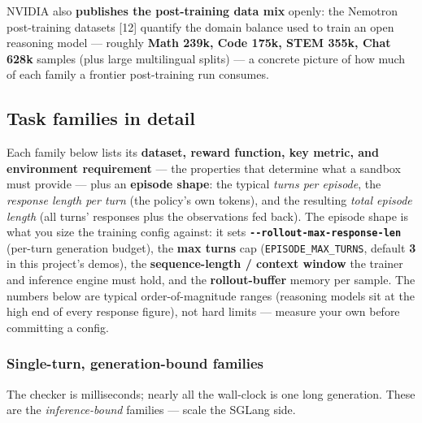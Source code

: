 \documentclass[
  paper=a4,
  ,captions=tableheading
]{scrartcl}
\begin{document}
NVIDIA also \textbf{publishes the post-training data mix} openly: the
Nemotron post-training datasets {[}12{]} quantify the domain balance
used to train an open reasoning model --- roughly \textbf{Math 239k,
Code 175k, STEM 355k, Chat 628k} samples (plus large multilingual
splits) --- a concrete picture of how much of each family a frontier
post-training run consumes.

\hypertarget{task-families-in-detail}{%
\subsection{Task families in detail}\label{task-families-in-detail}}

Each family below lists its \textbf{dataset, reward function, key
metric, and environment requirement} --- the properties that determine
what a sandbox must provide --- plus an \textbf{episode shape}: the
typical \emph{turns per episode}, the \emph{response length per turn}
(the policy's own tokens), and the resulting \emph{total episode length}
(all turns' responses plus the observations fed back). The episode shape
is what you size the training config against: it sets
\textbf{\texttt{-\/-rollout-max-response-len}} (per-turn generation
budget), the \textbf{max turns} cap (\texttt{EPISODE\_MAX\_TURNS},
default \textbf{3} in this project's demos), the \textbf{sequence-length
/ context window} the trainer and inference engine must hold, and the
\textbf{rollout-buffer} memory per sample. The numbers below are typical
order-of-magnitude ranges (reasoning models sit at the high end of every
response figure), not hard limits --- measure your own before committing
a config.

\hypertarget{single-turn-generation-bound-families}{%
\subsubsection{Single-turn, generation-bound
families}\label{single-turn-generation-bound-families}}

The checker is milliseconds; nearly all the wall-clock is one long
generation. These are the \emph{inference-bound} families --- scale the
SGLang side.
\end{document}
